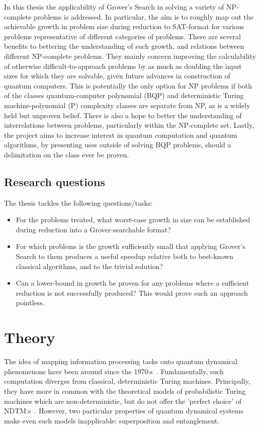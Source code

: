 \documentclass[msc,lith,english]{liuthesis}
\begin{document}
In this thesis the applicability of Grover's Search in solving a variety of NP-complete problems is addressed. In particular, the aim is to roughly map out the achievable growth in problem size during reduction to SAT-format for various problems representative of different categories of problems. There are several benefits to bettering the understanding of such growth, and relations between different NP-complete problems. They mainly concern improving the calculability of otherwise difficult-to-approach problems by as much as doubling the input sizes for which they are solvable, given future advances in construction of quantum computers. This is potentially the only option for NP problems if both of the classes quantum-computer polynomial (BQP) and deterministic Turing machine-polynomial (P) complexity classes are separate from NP, as is a widely held but unproven belief. There is also a hope to better the understanding of interrelations between problems, particularly within the NP-complete set. Lastly, the project aims to increase interest in quantum computation and quantum algorithms, by presenting uses outside of solving BQP problems, should a delimitation on the class ever be proven.

\section{Research questions}
The thesis tackles the following questions/tasks:
\begin{itemize}
    \item For the problems treated, what worst-case growth in size can be established during reduction into a Grover-searchable format?
    \item For which problems is the growth sufficiently small that applying Grover's Search to them produces a useful speedup relative both to best-known classical algorithms, and to the trivial solution?
    \item Can a lower-bound in growth be proven for any problems where a sufficient reduction is not successfully produced? This would prove such an approach pointless.
\end{itemize}

\chapter{Theory}
The idea of mapping information processing tasks onto quantum dynamical phenomenons have been around since the 1970:s~\cite{QCQI}. Fundamentally, such computation diverges from classical, deterministic Turing machines. Principally, they have more in common with the theoretical models of probabilistic Turing machines which are non-deterministic, but do not offer the 'perfect choice' of NDTM:s~\cite{CCAMA}. However, two particular properties of quantum dynamical systems make even such models inapplicable: superposition and entanglement. 
\end{document}
